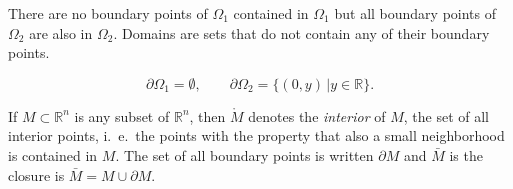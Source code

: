 There are no boundary points of $\Omega_1$ contained in $\Omega_1$
but all boundary points of $\Omega_2$ are also in $\Omega_2$.
Domains are sets that do not contain any of their boundary points.

\begin{beispiel}
\[
\partial \Omega_1=\emptyset,\qquad\partial \Omega_2=\{(0,y)\,|y\in\mathbb R\}.
\]
\end{beispiel}

\begin{definition}
\label{definition:interior}
If $M\subset\mathbb R^n$ is any subset of $\mathbb R^n$,
then $\mathring M$ denotes the {\em interior} of $M$, the set of all interior
points, i.~e.~the points with the property that also a small neighborhood
is contained in $M$.
The set of all boundary points is written $\partial M$ and $\bar M$
is the closure is $\bar M=M\cup \partial M$.
\end{definition}

